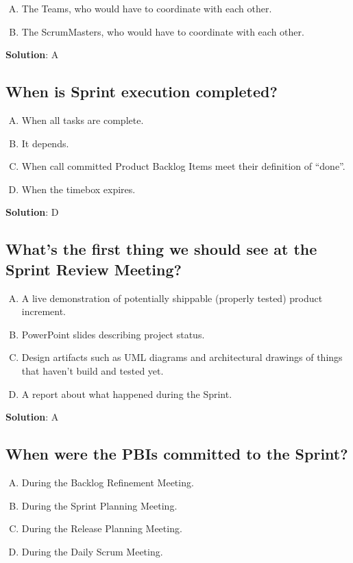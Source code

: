 \begin{enumerate}[A)]
  \item The Teams, who would have to coordinate with each other.
  \item The ScrumMasters, who would have to coordinate with each other.
\end{enumerate}


\textbf{Solution}: A


\subsection{When is Sprint execution completed?}
\begin{enumerate}[A)]
  \item When all tasks are complete.
  \item It depends.
  \item When call committed Product Backlog Items meet their definition of \enquote{done}.
  \item When the timebox expires.
\end{enumerate}


\textbf{Solution}: D


\subsection{What's the first thing we should see at the Sprint Review Meeting?}
\begin{enumerate}[A)]
  \item A live demonstration of potentially shippable (properly tested) product increment.
  \item PowerPoint slides describing project status.
  \item Design artifacts such as UML diagrams and architectural drawings of things that haven't
    build and tested yet.
  \item A report about what happened during the Sprint.
\end{enumerate}


\textbf{Solution}: A


\subsection{When were the PBIs committed to the Sprint?}
\begin{enumerate}[A)]
  \item During the Backlog Refinement Meeting.
  \item During the Sprint Planning Meeting.
  \item During the Release Planning Meeting.
  \item During the Daily Scrum Meeting.
\end{enumerate}


